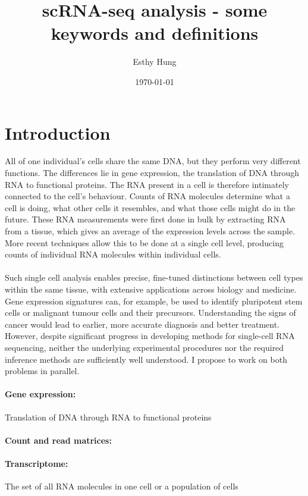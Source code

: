 \documentclass[a4paper,12pt]{article}
\title{scRNA-seq analysis - some keywords and definitions}
\author{Esthy Hung}
\date{\today}
\begin{document}
\maketitle
\section{Introduction}
All of one individual’s cells share the same DNA, but they perform very different functions. The differences lie in gene expression, the translation of DNA through RNA to functional proteins. The RNA present in a cell is therefore intimately connected to the cell’s behaviour. Counts of RNA molecules determine what a cell is doing, what other cells it resembles, and what those cells might do in the future. These RNA measurements were first done in bulk by extracting RNA from a tissue, which gives an average of the expression levels across the sample. More recent techniques allow this to be done at a single cell level, producing counts of individual RNA molecules within individual cells.
\paragraph{}
Such single cell analysis enables precise, fine-tuned distinctions between cell types within the same tissue, with extensive applications across biology and medicine.  Gene expression signatures can, for example, be used to identify pluripotent stem cells or malignant tumour cells and their precursors. Understanding the signs of cancer would lead to earlier, more accurate diagnosis and better treatment. However, despite significant progress in developing methods for single-cell RNA sequencing, neither the underlying experimental procedures nor the required inference methods are sufficiently well understood. I propose to work on both problems in parallel.

\paragraph{Gene expression:} Translation of DNA through RNA to functional proteins
\paragraph{Count and read matrices:}
\paragraph{Transcriptome:} The set of all RNA molecules in one cell or a population of cells
\end{document}
